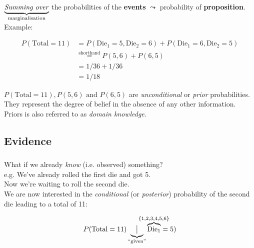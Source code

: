 \begin{frame}

$\underbrace{\text{\emph{Summing over}}}_{\text{marginalisation}}$ the probabilities of the \textbf{events} $\leadsto$ probability of \textbf{proposition}.\\

Example:

\begin{align}
P(\text{Total} = 11) &= P(\text{Die}_{1} = 5, \text{Die}_{2} = 6) + P(\text{Die}_{1} = 6, \text{Die}_{2} = 5)\\
        &\stackrel{\text{shorthand}}{=} P(5,6) + P(6,5)\\
        &= 1 / 36 + 1/36\\
        &= 1/18
\end{align}

$P(\text{Total} = 11), P(5,6) \text{ and } P(6,5)$ are \emph{unconditional} or \emph{prior} probabilities.\\
They represent the degree of belief in the absence of any other information.\\
Priors is also referred to as \emph{domain knowledge}.
        
\end{frame}

\subsection{Evidence}

\begin{frame}\frametitle{\subsecname}

What if we already \emph{know} (i.e. observed) something?\\

e.g. We've already rolled the first die and got 5.\\
Now we're waiting to roll the second die.\\

We are now interested in the \emph{conditional} (or \emph{posterior}) probability of the second die leading to a total of 11:

\begin{equation}
P(\text{Total}= 11) \underbrace{\big|}_{\text{``given''}} \overbrace{\text{Die}_{1}}^{\mathclap{\{1,2,3,4,5,6\}}} = 5)
\end{equation}

\end{frame}

